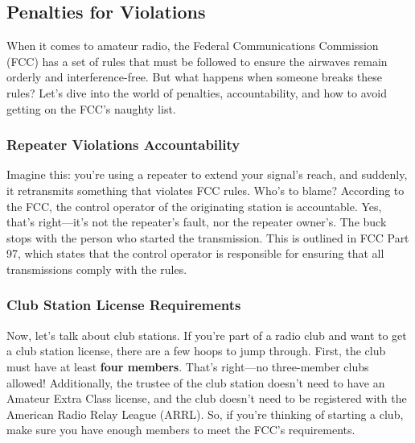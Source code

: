 \subsection{Penalties for Violations}
\label{subsec:penalties}

When it comes to amateur radio, the Federal Communications Commission (FCC) has a set of rules that must be followed to ensure the airwaves remain orderly and interference-free. But what happens when someone breaks these rules? Let's dive into the world of penalties, accountability, and how to avoid getting on the FCC's naughty list.

\subsubsection*{Repeater Violations Accountability}
Imagine this: you're using a repeater to extend your signal's reach, and suddenly, it retransmits something that violates FCC rules. Who's to blame? According to the FCC, the control operator of the originating station is accountable. Yes, that's right—it's not the repeater's fault, nor the repeater owner's. The buck stops with the person who started the transmission. This is outlined in FCC Part 97, which states that the control operator is responsible for ensuring that all transmissions comply with the rules.


\subsubsection*{Club Station License Requirements}
Now, let's talk about club stations. If you're part of a radio club and want to get a club station license, there are a few hoops to jump through. First, the club must have at least \textbf{four members}. That's right—no three-member clubs allowed! Additionally, the trustee of the club station doesn't need to have an Amateur Extra Class license, and the club doesn't need to be registered with the American Radio Relay League (ARRL). So, if you're thinking of starting a club, make sure you have enough members to meet the FCC's requirements.

